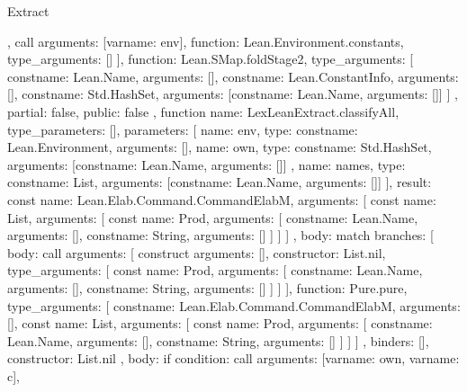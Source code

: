 \begin{lexlean}{Extract}
\begin{toolingmodule}
{{{{          },
          call{
            arguments: [var{name: env}],
            function: Lean.Environment.constants,
            type_arguments: []
          }
        ],
        function: Lean.SMap.foldStage2,
        type_arguments: [
          const{name: Lean.Name, arguments: []},
          const{name: Lean.ConstantInfo, arguments: []},
          const{name: Std.HashSet, arguments: [const{name: Lean.Name, arguments: []}]}
        ]
      },
      partial: false,
      public: false
    },
    function{
      name: LexLeanExtract.classifyAll,
      type_parameters: [],
      parameters: [
        {name: env, type: const{name: Lean.Environment, arguments: []}},
        {
          name: own,
          type: const{name: Std.HashSet, arguments: [const{name: Lean.Name, arguments: []}]}
        },
        {name: names, type: const{name: List, arguments: [const{name: Lean.Name, arguments: []}]}}
      ],
      result: const{
        name: Lean.Elab.Command.CommandElabM,
        arguments: [
          const{
            name: List,
            arguments: [
              const{
                name: Prod,
                arguments: [
                  const{name: Lean.Name, arguments: []},
                  const{name: String, arguments: []}
                ]
              }
            ]
          }
        ]
      },
      body: match{
        branches: [
          {
            body: call{
              arguments: [
                construct{
                  arguments: [],
                  constructor: List.nil,
                  type_arguments: [
                    const{
                      name: Prod,
                      arguments: [
                        const{name: Lean.Name, arguments: []},
                        const{name: String, arguments: []}
                      ]
                    }
                  ]
                }
              ],
              function: Pure.pure,
              type_arguments: [
                const{name: Lean.Elab.Command.CommandElabM, arguments: []},
                const{
                  name: List,
                  arguments: [
                    const{
                      name: Prod,
                      arguments: [
                        const{name: Lean.Name, arguments: []},
                        const{name: String, arguments: []}
                      ]
                    }
                  ]
                }
              ]
            },
            binders: [],
            constructor: List.nil
          },
          {
            body: if{
              condition: call{
                arguments: [var{name: own}, var{name: c}],
}}}}}}
\end{toolingmodule}
\end{lexlean}
